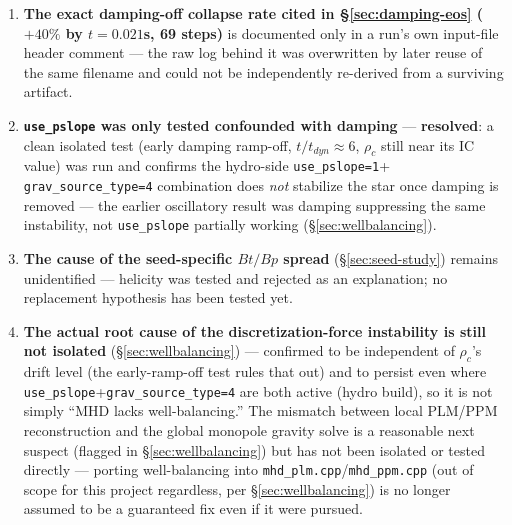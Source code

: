 \documentclass[11pt,a4paper]{scrartcl}
\newcommand{\code}[1]{\texttt{\small #1}}
\begin{document}
\begin{enumerate}[leftmargin=1.6em,itemsep=0.35em]
  sensitivity of the implicit toroidal branch
  (\code{\_solve\_rho\_implicit}) near a marginal equilibrium, where
  the Picard iteration lands on slightly different nearby fixed points
  depending on mesh spacing; (2) a numerical effect distinct from the
  Green's-function overflow already found and fixed. Does not affect
  the certified boundary ($K=3\times10^{-3}$, reverified clean on both
  domain and mesh axes) or the headline $+47\%$ mass-gain result,
  since that result never depended on $K\ge4\times10^{-3}$. Would need
  comparing full $\rho(r,\theta)$ profiles across mesh sizes (not just
  scalars) to tell the two hypotheses apart; not done here.
\item \textbf{The exact damping-off collapse rate cited in
  \S\ref{sec:damping-eos} ($+40\%$ by $t=0.021$s, 69 steps)} is
  documented only in a run's own input-file header comment --- the raw
  log behind it was overwritten by later reuse of the same filename and
  could not be independently re-derived from a surviving artifact.
\item \textbf{\code{use\_pslope} was only tested confounded with
  damping} --- \textbf{resolved}: a clean isolated test (early damping
  ramp-off, $t/t_{dyn}\approx6$, $\rho_c$ still near its IC value) was
  run and confirms the hydro-side \code{use\_pslope=1}+
  \code{grav\_source\_type=4} combination does \emph{not} stabilize the
  star once damping is removed --- the earlier oscillatory result was
  damping suppressing the same instability, not \code{use\_pslope}
  partially working (\S\ref{sec:wellbalancing}).
\item \textbf{The cause of the seed-specific $Bt/Bp$ spread}
  (\S\ref{sec:seed-study}) remains unidentified --- helicity was tested
  and rejected as an explanation; no replacement hypothesis has been
  tested yet.
\item \textbf{The actual root cause of the discretization-force
  instability is still not isolated} (\S\ref{sec:wellbalancing}) ---
  confirmed to be independent of $\rho_c$'s drift level (the
  early-ramp-off test rules that out) and to persist even where
  \code{use\_pslope}+\code{grav\_source\_type=4} are both active (hydro
  build), so it is not simply ``MHD lacks well-balancing.'' The
  mismatch between local PLM/PPM reconstruction and the global monopole
  gravity solve is a reasonable next suspect (flagged in
  \S\ref{sec:wellbalancing}) but has not been isolated or tested
  directly --- porting well-balancing into
  \code{mhd\_plm.cpp}/\code{mhd\_ppm.cpp} (out of scope for this
  project regardless, per \S\ref{sec:wellbalancing}) is no longer
  assumed to be a guaranteed fix even if it were pursued.
\end{enumerate}
\end{document}
